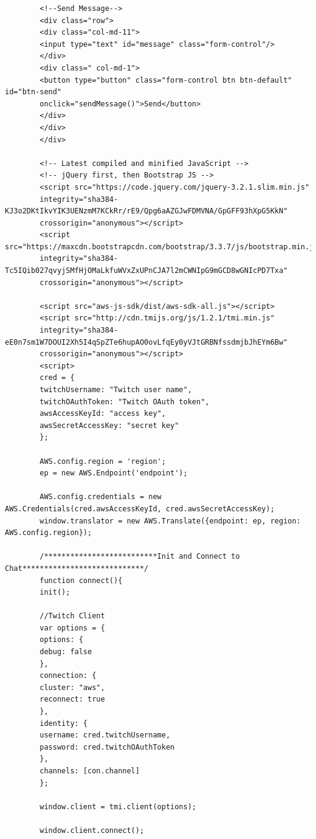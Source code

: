 \documentclass[english,runningheads,a4paper]{llncs}[2018/03/10]
\begin{document}
{\begin{verbatim}
        <!--Send Message-->
        <div class="row">
        <div class="col-md-11">
        <input type="text" id="message" class="form-control"/>
        </div>
        <div class=" col-md-1">
        <button type="button" class="form-control btn btn-default" id="btn-send"
        onclick="sendMessage()">Send</button>
        </div>
        </div>
        </div>
        
        <!-- Latest compiled and minified JavaScript -->
        <!-- jQuery first, then Bootstrap JS -->
        <script src="https://code.jquery.com/jquery-3.2.1.slim.min.js"
        integrity="sha384-KJ3o2DKtIkvYIK3UENzmM7KCkRr/rE9/Qpg6aAZGJwFDMVNA/GpGFF93hXpG5KkN"
        crossorigin="anonymous"></script>
        <script src="https://maxcdn.bootstrapcdn.com/bootstrap/3.3.7/js/bootstrap.min.js"
        integrity="sha384-Tc5IQib027qvyjSMfHjOMaLkfuWVxZxUPnCJA7l2mCWNIpG9mGCD8wGNIcPD7Txa"
        crossorigin="anonymous"></script>
        
        <script src="aws-js-sdk/dist/aws-sdk-all.js"></script>
        <script src="http://cdn.tmijs.org/js/1.2.1/tmi.min.js"
        integrity="sha384-eE0n7sm1W7DOUI2Xh5I4qSpZTe6hupAO0ovLfqEy0yVJtGRBNfssdmjbJhEYm6Bw"
        crossorigin="anonymous"></script>
        <script>
        cred = {
        twitchUsername: "Twitch user name",
        twitchOAuthToken: "Twitch OAuth token",
        awsAccessKeyId: "access key",
        awsSecretAccessKey: "secret key"
        };
        
        AWS.config.region = 'region';
        ep = new AWS.Endpoint('endpoint');
        
        AWS.config.credentials = new AWS.Credentials(cred.awsAccessKeyId, cred.awsSecretAccessKey);
        window.translator = new AWS.Translate({endpoint: ep, region: AWS.config.region});
        
        /**************************Init and Connect to Chat****************************/
        function connect(){
        init();
        
        //Twitch Client
        var options = {
        options: {
        debug: false
        },
        connection: {
        cluster: "aws",
        reconnect: true
        },
        identity: {
        username: cred.twitchUsername,
        password: cred.twitchOAuthToken
        },
        channels: [con.channel]
        };
        
        window.client = tmi.client(options);
        
        window.client.connect();
        

\end{verbatim}}
\end{document}
